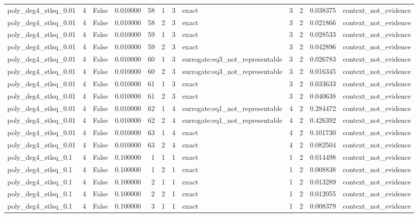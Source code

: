 \begin{tabular}{lrrrrrrlrrrl}
poly\_deg4\_stlsq\_0.01 & 4 & False & 0.010000 & 58 & 1 & 3 & exact & 3 & 2 & 0.038375 & context\_not\_evidence \\
poly\_deg4\_stlsq\_0.01 & 4 & False & 0.010000 & 58 & 2 & 3 & exact & 3 & 2 & 0.021866 & context\_not\_evidence \\
poly\_deg4\_stlsq\_0.01 & 4 & False & 0.010000 & 59 & 1 & 3 & exact & 3 & 2 & 0.028533 & context\_not\_evidence \\
poly\_deg4\_stlsq\_0.01 & 4 & False & 0.010000 & 59 & 2 & 3 & exact & 3 & 2 & 0.042896 & context\_not\_evidence \\
poly\_deg4\_stlsq\_0.01 & 4 & False & 0.010000 & 60 & 1 & 3 & surrogate:eq3\_not\_representable & 3 & 2 & 0.026783 & context\_not\_evidence \\
poly\_deg4\_stlsq\_0.01 & 4 & False & 0.010000 & 60 & 2 & 3 & surrogate:eq3\_not\_representable & 3 & 2 & 0.016345 & context\_not\_evidence \\
poly\_deg4\_stlsq\_0.01 & 4 & False & 0.010000 & 61 & 1 & 3 & exact & 3 & 2 & 0.033633 & context\_not\_evidence \\
poly\_deg4\_stlsq\_0.01 & 4 & False & 0.010000 & 61 & 2 & 3 & exact & 3 & 2 & 0.040638 & context\_not\_evidence \\
poly\_deg4\_stlsq\_0.01 & 4 & False & 0.010000 & 62 & 1 & 4 & surrogate:eq1\_not\_representable & 4 & 2 & 0.284472 & context\_not\_evidence \\
poly\_deg4\_stlsq\_0.01 & 4 & False & 0.010000 & 62 & 2 & 4 & surrogate:eq1\_not\_representable & 4 & 2 & 0.426392 & context\_not\_evidence \\
poly\_deg4\_stlsq\_0.01 & 4 & False & 0.010000 & 63 & 1 & 4 & exact & 4 & 2 & 0.101730 & context\_not\_evidence \\
poly\_deg4\_stlsq\_0.01 & 4 & False & 0.010000 & 63 & 2 & 4 & exact & 4 & 2 & 0.082504 & context\_not\_evidence \\
poly\_deg4\_stlsq\_0.1 & 4 & False & 0.100000 & 1 & 1 & 1 & exact & 1 & 2 & 0.014498 & context\_not\_evidence \\
poly\_deg4\_stlsq\_0.1 & 4 & False & 0.100000 & 1 & 2 & 1 & exact & 1 & 2 & 0.008838 & context\_not\_evidence \\
poly\_deg4\_stlsq\_0.1 & 4 & False & 0.100000 & 2 & 1 & 1 & exact & 1 & 2 & 0.013289 & context\_not\_evidence \\
poly\_deg4\_stlsq\_0.1 & 4 & False & 0.100000 & 2 & 2 & 1 & exact & 1 & 2 & 0.012055 & context\_not\_evidence \\
poly\_deg4\_stlsq\_0.1 & 4 & False & 0.100000 & 3 & 1 & 1 & exact & 1 & 2 & 0.008379 & context\_not\_evidence \\

\end{tabular}
